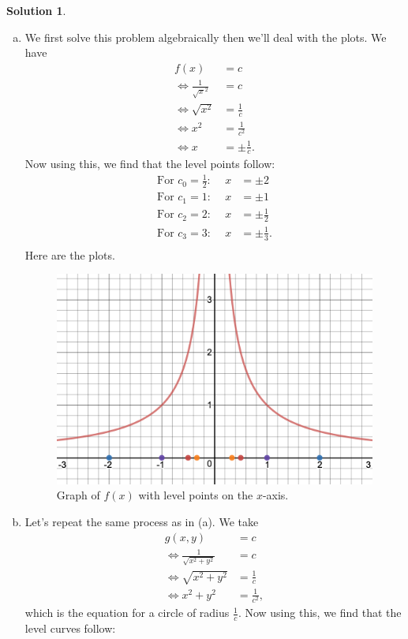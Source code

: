 \documentclass[12pt]{report} %
\theoremstyle{definition}
\newtheorem{solution}{Solution}
\begin{document}
\begin{solution}~
\begin{enumerate}[(a)]
    \item We first solve this problem algebraically then we'll deal with the plots.  We have
    \begin{align*}
        f(x)&=c\\
        \iff \frac{1}{\sqrt{x}^2} &= c\\
        \iff \sqrt{x^2}&=\frac{1}{c}\\
        \iff x^2&= \frac{1}{c^2}\\
        \iff x &= \pm \frac{1}{c}.
    \end{align*}
    Now using this, we find that the level points follow:
    \begin{align*}
        \textrm{For $c_0=\frac{1}{2}$:~}\quad x&=\pm 2\\
        \textrm{For $c_1=1$:~}\quad x&=\pm 1\\
        \textrm{For $c_2=2$:~}\quad x&=\pm \frac{1}{2}\\
        \textrm{For $c_3=3$:~}\quad x&=\pm \frac{1}{3}.\\
    \end{align*}
    Here are the plots.
    \begin{figure}[H]
        \centering
        \includegraphics[width=.6\textwidth]{Images/level_points.png}
        \caption{Graph of $f(x)$ with level points on the $x$-axis.}
    \end{figure}
    \item Let's repeat the same process as in (a). We take
    \begin{align*}
        g(x,y)&=c\\
        \iff \frac{1}{\sqrt{x^2+y^2}}&= c\\
        \iff \sqrt{x^2+y^2}&=\frac{1}{c}\\
        \iff x^2+y^2 &= \frac{1}{c^2},
    \end{align*}
    which is the equation for a circle of radius $\frac{1}{c}$. Now using this, we find that the level curves follow:

\end{enumerate}
\end{solution}
\end{document}
